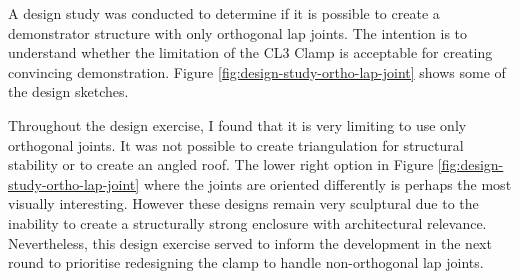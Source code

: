 A design study was conducted to determine if it is possible to create a demonstrator structure with only orthogonal lap joints. The intention is to understand whether the limitation of the CL3 Clamp is acceptable for creating convincing demonstration. Figure \ref{fig:design-study-ortho-lap-joint} shows some of the design sketches.

Throughout the design exercise, I found that it is very limiting to use only orthogonal joints. It was not possible to create triangulation for structural stability or to create an angled roof. The lower right option in Figure \ref{fig:design-study-ortho-lap-joint} where the joints are oriented differently is perhaps the most visually interesting. However these designs remain very sculptural due to the inability to create a structurally strong enclosure with architectural relevance. Nevertheless, this design exercise served to inform the development in the next round  to prioritise redesigning the clamp to handle non-orthogonal lap joints.
